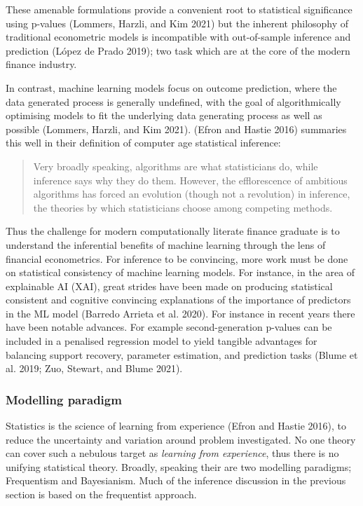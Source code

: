 \documentclass{article}
\begin{document}
These amenable formulations provide a convenient root to statistical
significance using p-values (Lommers, Harzli, and Kim 2021) but the
inherent philosophy of traditional econometric models is incompatible
with out-of-sample inference and prediction (López de Prado 2019); two
task which are at the core of the modern finance industry.

In contrast, machine learning models focus on outcome prediction, where
the data generated process is generally undefined, with the goal of
algorithmically optimising models to fit the underlying data generating
process as well as possible (Lommers, Harzli, and Kim 2021). (Efron and
Hastie 2016) summaries this well in their definition of computer age
statistical inference:

\begin{quote}
Very broadly speaking, algorithms are what statisticians do, while
inference says why they do them. However, the efflorescence of ambitious
algorithms has forced an evolution (though not a revolution) in
inference, the theories by which statisticians choose among competing
methods.
\end{quote}

Thus the challenge for modern computationally literate finance graduate
is to understand the inferential benefits of machine learning through
the lens of financial econometrics. For inference to be convincing, more
work must be done on statistical consistency of machine learning models.
For instance, in the area of explainable AI (XAI), great strides have
been made on producing statistical consistent and cognitive convincing
explanations of the importance of predictors in the ML model (Barredo
Arrieta et al. 2020). For instance in recent years there have been
notable advances. For example second-generation p-values can be included
in a penalised regression model to yield tangible advantages for
balancing support recovery, parameter estimation, and prediction tasks
(Blume et al. 2019; Zuo, Stewart, and Blume 2021).

\hypertarget{modelling-paradigm}{%
\subsubsection{Modelling paradigm}\label{modelling-paradigm}}

Statistics is the science of learning from experience (Efron and Hastie
2016), to reduce the uncertainty and variation around problem
investigated. No one theory can cover such a nebulous target as
\emph{learning from experience}, thus there is no unifying statistical
theory. Broadly, speaking their are two modelling paradigms; Frequentism
and Bayesianism. Much of the inference discussion in the previous
section is based on the frequentist approach.
\end{document}
